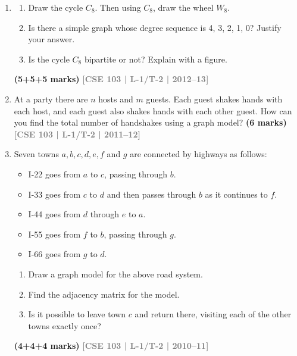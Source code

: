 \documentclass[12pt,a3paper]{article}
\newcommand{\yr}[1]{\hfill\textcolor{gray}{\small\textbf{[#1]}}}
\newcommand{\mk}[1]{\textcolor{orange!70!black}{\small\textbf{(#1 marks)}}}
\begin{document}
\begin{enumerate}
\begin{center}
\end{center}
\mk{15} \yr{CSE 103 | L-1/T-2 | 2013--14}


\item \begin{enumerate}
  \item Draw the cycle $C_8$. Then using $C_8$, draw the wheel $W_8$.
  \item Is there a simple graph whose degree sequence is 4, 3, 2, 1, 0? Justify your answer.
  \item Is the cycle $C_8$ bipartite or not? Explain with a figure.
\end{enumerate}
\mk{5+5+5} \yr{CSE 103 | L-1/T-2 | 2012--13}

\item At a party there are $n$ hosts and $m$ guests. Each guest shakes hands with each host, and each guest also shakes hands with each other guest. How can you find the total number of handshakes using a graph model?
\mk{6} \yr{CSE 103 | L-1/T-2 | 2011--12}

\item Seven towns $a, b, c, d, e, f$ and $g$ are connected by highways as follows:
\begin{itemize}[leftmargin=1.8em,itemsep=2pt,label={$\bullet$}]
  \item I-22 goes from $a$ to $c$, passing through $b$.
  \item I-33 goes from $c$ to $d$ and then passes through $b$ as it continues to $f$.
  \item I-44 goes from $d$ through $e$ to $a$.
  \item I-55 goes from $f$ to $b$, passing through $g$.
  \item I-66 goes from $g$ to $d$.
\end{itemize}
\begin{enumerate}
  \item Draw a graph model for the above road system.
  \item Find the adjacency matrix for the model.
  \item Is it possible to leave town $c$ and return there, visiting each of the other towns exactly once?
\end{enumerate}
\mk{4+4+4} \yr{CSE 103 | L-1/T-2 | 2010--11}


\end{enumerate}
\end{document}
